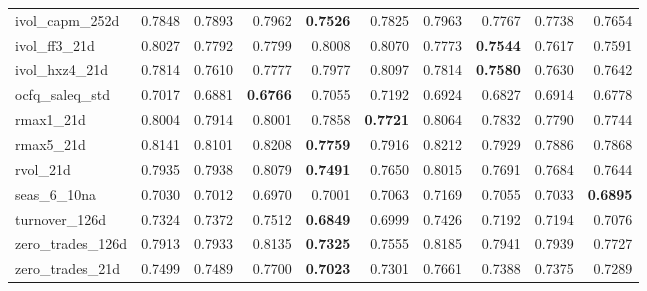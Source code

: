 \begin{longtable}{>{\raggedright\arraybackslash}p{2.6cm}rrrrrrrrr}
ivol\_capm\_252d & 0.7848 & 0.7893 & 0.7962 & \textbf{\cellcolor{blue!10}0.7526} & \cellcolor{blue!10}0.7825 & 0.7963 & \cellcolor{blue!10}0.7767 & \cellcolor{blue!10}0.7738 & \cellcolor{blue!10}0.7654 \\
ivol\_ff3\_21d & 0.8027 & \cellcolor{blue!10}0.7792 & \cellcolor{blue!10}0.7799 & \cellcolor{blue!10}0.8008 & 0.8070 & \cellcolor{blue!10}0.7773 & \textbf{\cellcolor{blue!10}0.7544} & \cellcolor{blue!10}0.7617 & \cellcolor{blue!10}0.7591 \\
ivol\_hxz4\_21d & 0.7814 & \cellcolor{blue!10}0.7610 & \cellcolor{blue!10}0.7777 & 0.7977 & 0.8097 & 0.7814 & \textbf{\cellcolor{blue!10}0.7580} & \cellcolor{blue!10}0.7630 & \cellcolor{blue!10}0.7642 \\
ocfq\_saleq\_std & 0.7017 & \cellcolor{blue!10}0.6881 & \textbf{\cellcolor{blue!10}0.6766} & 0.7055 & 0.7192 & \cellcolor{blue!10}0.6924 & \cellcolor{blue!10}0.6827 & \cellcolor{blue!10}0.6914 & \cellcolor{blue!10}0.6778 \\
rmax1\_21d & 0.8004 & \cellcolor{blue!10}0.7914 & \cellcolor{blue!10}0.8001 & \cellcolor{blue!10}0.7858 & \textbf{\cellcolor{blue!10}0.7721} & 0.8064 & \cellcolor{blue!10}0.7832 & \cellcolor{blue!10}0.7790 & \cellcolor{blue!10}0.7744 \\
rmax5\_21d & 0.8141 & \cellcolor{blue!10}0.8101 & 0.8208 & \textbf{\cellcolor{blue!10}0.7759} & \cellcolor{blue!10}0.7916 & 0.8212 & \cellcolor{blue!10}0.7929 & \cellcolor{blue!10}0.7886 & \cellcolor{blue!10}0.7868 \\
rvol\_21d & 0.7935 & 0.7938 & 0.8079 & \textbf{\cellcolor{blue!10}0.7491} & \cellcolor{blue!10}0.7650 & 0.8015 & \cellcolor{blue!10}0.7691 & \cellcolor{blue!10}0.7684 & \cellcolor{blue!10}0.7644 \\
seas\_6\_10na & 0.7030 & \cellcolor{blue!10}0.7012 & \cellcolor{blue!10}0.6970 & \cellcolor{blue!10}0.7001 & 0.7063 & 0.7169 & 0.7055 & 0.7033 & \textbf{\cellcolor{blue!10}0.6895} \\
turnover\_126d & 0.7324 & 0.7372 & 0.7512 & \textbf{\cellcolor{blue!10}0.6849} & \cellcolor{blue!10}0.6999 & 0.7426 & \cellcolor{blue!10}0.7192 & \cellcolor{blue!10}0.7194 & \cellcolor{blue!10}0.7076 \\
zero\_trades\_126d & 0.7913 & 0.7933 & 0.8135 & \textbf{\cellcolor{blue!10}0.7325} & \cellcolor{blue!10}0.7555 & 0.8185 & 0.7941 & 0.7939 & \cellcolor{blue!10}0.7727 \\
zero\_trades\_21d & 0.7499 & \cellcolor{blue!10}0.7489 & 0.7700 & \textbf{\cellcolor{blue!10}0.7023} & \cellcolor{blue!10}0.7301 & 0.7661 & \cellcolor{blue!10}0.7388 & \cellcolor{blue!10}0.7375 & \cellcolor{blue!10}0.7289 \\

\end{longtable}
